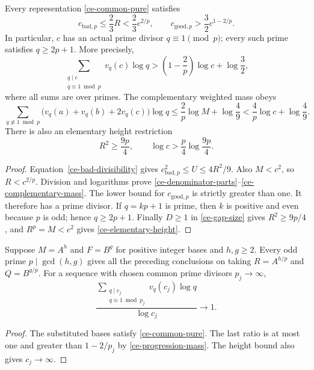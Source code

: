 \begin{corollary}
\label{ce-csupport}
Every representation \eqref{ce-common-pure} satisfies
\begin{equation}\label{ce-denominator-parts}
 c_{\mathrm{bad},p}\le\frac23R<\frac23c^{2/p},
 \qquad c_{\mathrm{good},p}>\frac32c^{1-2/p}.
\end{equation}
In particular, $c$ has an actual prime divisor $q\equiv1\pmod p$;
every such prime satisfies $q\ge2p+1$. More precisely,
\begin{equation}\label{ce-progression-mass}
 \sum_{\substack{q\mid c\\q\equiv1\bmod p}}v_q(c)\log q
 >\left(1-\frac2p\right)\log c+\log\frac32,
\end{equation}
where all sums are over primes. The complementary weighted mass obeys
\begin{equation}\label{ce-complementary-mass}
 \sum_{q\not\equiv1\bmod p}
 \bigl(v_q(a)+v_q(b)+2v_q(c)\bigr)\log q
 \le\frac2p\log M+\log\frac49
 <\frac4p\log c+\log\frac49.
\end{equation}
There is also an elementary height restriction
\begin{equation}\label{ce-elementary-height}
 R^2\ge\frac{9p}{4},\qquad
 \log c>\frac p4\log\frac{9p}{4}.
\end{equation}
\end{corollary}
\begin{proof}
Equation~\eqref{ce-bad-divisibility} gives
$c_{\mathrm{bad},p}^2\le U\le4R^2/9$. Also $M<c^2$, so
$R<c^{2/p}$. Division and logarithms prove
\eqref{ce-denominator-parts}--\eqref{ce-complementary-mass}.
The lower bound for $c_{\mathrm{good},p}$ is strictly greater than
one. It therefore has a prime divisor. If $q=kp+1$ is prime,
then $k$ is positive and even because $p$ is odd; hence $q\ge2p+1$.
Finally $D\ge1$ in \eqref{ce-gap-size} gives $R^2\ge9p/4$,
and $R^p=M<c^2$ gives \eqref{ce-elementary-height}.
\end{proof}

\begin{corollary}
\label{ce-common-prime}
Suppose $M=A^h$ and $F=B^g$ for positive integer bases and
$h,g\ge2$. Every odd prime $p\mid\gcd(h,g)$ gives all the
preceding conclusions on taking $R=A^{h/p}$ and $Q=B^{g/p}$.
For a sequence with chosen common prime divisors $p_j\to\infty$,
\[
 \frac{\displaystyle\sum_{\substack{q\mid c_j\\q\equiv1\bmod p_j}}
       v_q(c_j)\log q}{\log c_j}\longrightarrow1.
\]
\end{corollary}
\begin{proof}
The substituted bases satisfy \eqref{ce-common-pure}. The last
ratio is at most one and greater than $1-2/p_j$ by
\eqref{ce-progression-mass}. The height bound also gives
$c_j\to\infty$.
\end{proof}

